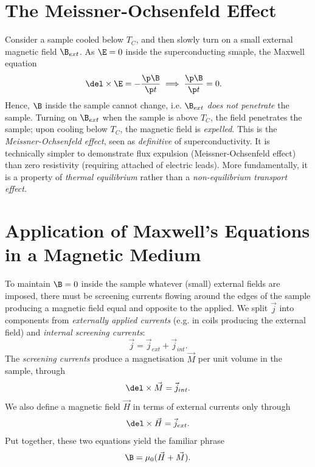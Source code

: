 \documentclass[qo.tex]{subfiles}
\begin{document}
\section{The Meissner-Ochsenfeld Effect}
Consider a sample cooled below $T_C$, and then slowly turn on a small external magnetic field $\B_{ext}$.
As $\E=0$ inside the superconducting smaple, the Maxwell equation
\begin{align}
    \del\times\E &= -\frac{\p\B}{\p t} \implies \frac{\p\B}{\p t}=0.
\end{align}
Hence, $\B$ inside the sample cannot change, i.e. $\B_{ext}$ \emph{does not penetrate} the sample.
Turning on $\B_{ext}$ when the sample is above $T_C$, the field penetrates the sample; upon cooling below $T_C$, the magnetic field is \emph{expelled}.
This is the \emph{Meissner-Ochsenfeld effect}, seen as \emph{definitive} of superconductivity.
It is technically simpler to demonstrate flux expulsion (Meissner-Ochsenfeld effect) than zero resistivity (requiring attached of electric leads).
More fundamentally, it is a property of \emph{thermal equilibrium} rather than a \emph{non-equilibrium transport effect.}

\section{Application of Maxwell's Equations in a Magnetic Medium}
To maintain $\B=0$ inside the sample whatever (small) external fields are imposed, there must be screening currents flowing around the edges of the sample producing a magnetic field equal and opposite to the applied. 
We split $\vec{j}$ into components from \emph{externally applied currents} (e.g. in coils producing the external field) and \emph{internal screening currents}: 
\begin{equation}
    \vec{j}=\vec{j}_{ext}+\vec{j}_{int}.
\end{equation}
The \emph{screening currents} produce a magnetisation $\vec{M}$ per unit volume in the sample, through 
\begin{equation}
    \del\times\vec{M}=\vec{j}_{int}.
\end{equation}
We also define a magnetic field $\vec{H}$ in terms of external currents only through 
\begin{equation}
    \del\times\vec{H}=\vec{j}_{ext}.
\end{equation}
Put together, these two equations yield the familiar phrase
\begin{equation}
    \B = \mu_0(\vec{H}+\vec{M}).
\end{equation}
\end{document}
